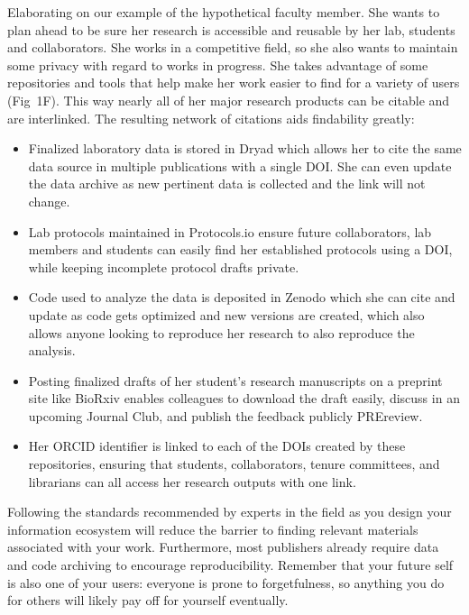 \documentclass[10pt,letterpaper]{article}
\begin{document}
Elaborating on our example of the hypothetical faculty member. She wants to plan 
ahead to be sure her research is accessible and reusable by her lab, students and 
collaborators. She works in a competitive field, so she also wants to maintain 
some privacy with regard to works in progress. She takes advantage of some
repositories and tools that help make her work easier to find for a variety of
users (Fig~1F). This way nearly all of her major research products can be citable and
are interlinked. The resulting network of citations aids findability greatly:

\begin{itemize}

\item
  Finalized laboratory data is stored in Dryad\cite{DRYAD2020} which allows her 
  to cite the same data source in multiple publications with a single DOI. She can even 
  update the data archive as new pertinent data is collected and the link will not change.
 
\item
  Lab protocols maintained in Protocols.io\cite{Teytelman2016} ensure future
  collaborators, lab members and students can easily find her established
  protocols using a DOI, while keeping incomplete protocol drafts private.

\item
  Code used to analyze the data is deposited in Zenodo\cite{ZENODO2020} which
  she can cite and update as code gets optimized and new versions are created,
  which also allows anyone looking to reproduce her research to also reproduce
  the analysis.

\item
  Posting finalized drafts of her student's research manuscripts on a preprint
  site like BioRxiv\cite{bioRxiv2020} enables colleagues to download the draft
  easily, discuss in an upcoming Journal Club, and publish the feedback publicly PREreview\cite{PREreview2020}.
  
  \item
  Her ORCID identifier is linked to each of the DOIs created by these
  repositories, ensuring that students, collaborators, tenure committees, and
  librarians can all access her research outputs with one link.

\end{itemize}

\noindent
Following the standards recommended by experts\cite{Wilkinson2016} in the field
as you design your information ecosystem will reduce the barrier to finding
relevant materials associated with your work. Furthermore, most publishers already
require data and code archiving to encourage reproducibility. Remember that your future self is
also one of your users: everyone is prone to forgetfulness, so anything you do
for others will likely pay off for yourself eventually\cite{Briney2015}.
\end{document}
